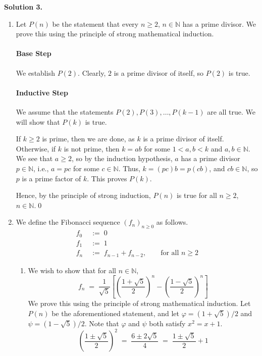 \documentclass[10pt]{article}
\begin{document}
        \clearpage
        \textbf{Solution 3.}
        \begin{enumerate}
                \item Let $P(n)$ be the statement that every $n \geq 2$, $n \in \mathbb{N}$ has a prime divisor.
                We prove this using the principle of strong mathematical induction.
                \paragraph{Base Step}
                We establish $P(2)$. Clearly, $2$ is a prime divisor of itself, so $P(2)$ is true.
                \paragraph{Inductive Step}
                We assume that the statements $P(2), P(3), \dots, P(k-1)$ are all true. We will show that $P(k)$ is true.

                If $k \geq 2$ is prime, then we are done, as $k$ is a prime divisor of itself. Otherwise, if
                $k$ is not prime, then $k = ab$ for some $1 < a, b < k$ and $a, b \in \mathbb{N}$. We see that $a \geq 2$,
                so by the induction hypothesis, $a$ has a prime divisor $p \in \mathbb{N}$, i.e.,  $a = pc$ for some $c \in \mathbb{N}$.
                Thus, $k = (pc)b = p(cb)$, and $cb \in \mathbb{N}$, so $p$ is a prime factor of $k$. This proves $P(k)$.

                Hence, by the principle of strong induction, $P(n)$ is true for all $n \geq 2$, $n \in \mathbb{N}$.\qed\\
                
                \item We define the Fibonacci sequence $(f_n)_{n\geq 0}$ as follows.
                \begin{align*}
                        f_0 \;&:=\; 0 \\
                        f_1 \;&:=\; 1 \\
                        f_n \;&:=\; f_{n - 1} + f_{n - 2}, \quad\quad\text{for all }n \geq 2
                \end{align*}
                \begin{enumerate}
                        \item We wish to show that for all $n \in \mathbb{N}$,
                        \[f_n \;=\; \frac{1}{\sqrt{5}}\left[ \left(\frac{1 + \sqrt{5}}{2}\right)^{\!\!n} - \left(\frac{1 - \sqrt{5}}{2}\right)^{\!\!n} \right] 
                        \tag{Binet's formula} \]
                        We prove this using the principle of strong mathematical induction.
                        Let $P(n)$ be the aforementioned statement, and let $\varphi = (1 + \sqrt{5})/2$ and $\psi = (1 - \sqrt{5})/2$.
                        Note that $\varphi$ and $\psi$ both satisfy $x^2 = x + 1$.
                        \[
                        \left(\frac{1 \pm \sqrt{5}}{2}\right)^2 \;=\; \frac{6 \pm 2\sqrt{5}}{4} \;=\; \frac{1 \pm \sqrt{5}}{2} + 1
                        \]

\end{enumerate}
\end{enumerate}
\end{document}

